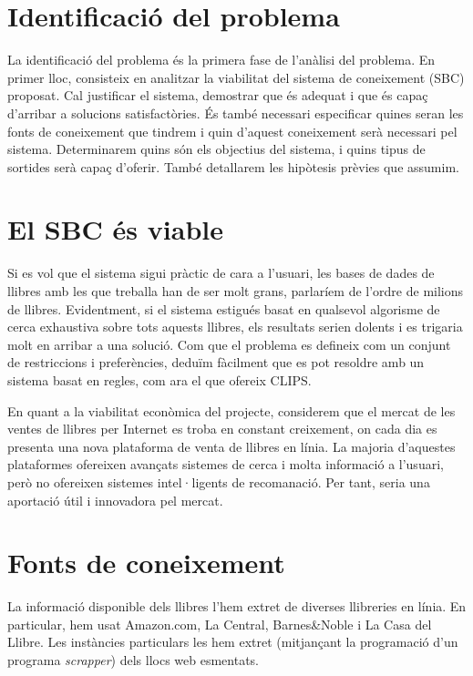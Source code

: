 
\section{Identificació del problema}

La identificació del problema és la primera fase de l'anàlisi del problema. En primer lloc, consisteix en analitzar la viabilitat del sistema de coneixement (SBC) proposat. Cal justificar el sistema, demostrar que és adequat i que és capaç d'arribar a solucions satisfactòries. És també necessari especificar quines seran les fonts de coneixement que tindrem i quin d'aquest coneixement serà necessari pel sistema. Determinarem quins són els objectius del sistema, i quins tipus de sortides serà capaç d'oferir. També detallarem les hipòtesis prèvies que assumim.

\section{El SBC és viable}

Si es vol que el sistema sigui pràctic de cara a l'usuari, les bases de dades de llibres amb les que treballa han de ser molt grans, parlaríem de l'ordre de milions de llibres. Evidentment, si el sistema estigués basat en qualsevol algorisme de cerca exhaustiva sobre tots aquests llibres, els resultats serien dolents i es trigaria molt en arribar a una solució. Com que el problema es defineix com un conjunt de restriccions i preferències, deduïm fàcilment que es pot resoldre amb un sistema basat en regles, com ara el que ofereix CLIPS.

En quant a la viabilitat econòmica del projecte, considerem que el mercat de les ventes de llibres per Internet es troba en constant creixement, on cada dia es presenta una nova plataforma de venta de llibres en línia. La majoria d'aquestes plataformes ofereixen avançats sistemes de cerca i molta informació a l'usuari, però no ofereixen sistemes intel·ligents de recomanació. Per tant, seria una aportació útil i innovadora pel mercat.

\section{Fonts de coneixement}

La informació disponible dels llibres l'hem extret de diverses llibreries en línia. En particular, hem usat Amazon.com, La Central, Barnes\&Noble i La Casa del Llibre. Les instàncies particulars les hem extret (mitjançant la programació d'un programa \emph{scrapper}) dels llocs web esmentats.

